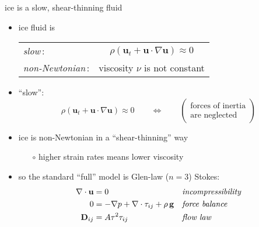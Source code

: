 \begin{frame}{ice is a slow, shear-thinning fluid}

\begin{itemize}
\item ice fluid is

\smallskip
  \begin{tabular}{lc}
  \emph{slow}\,: & $\rho \left(\mathbf{u}_t + \mathbf{u}\cdot\nabla \mathbf{u}\right) \approx 0$ \\
  \emph{non-Newtonian}\,: & viscosity $\nu$ is not constant
  \end{tabular}

\bigskip
\item ``slow'':
  $$\rho \left(\mathbf{u}_t + \mathbf{u}\cdot\nabla \mathbf{u}\right) \approx 0 \qquad \iff \qquad \begin{pmatrix} \text{forces of inertia} \\ \text{are neglected} \end{pmatrix}$$

\medskip
\item ice is non-Newtonian in a ``shear-thinning'' way
  \begin{itemize}
  \item[$\circ$] higher strain rates means lower viscosity
  \end{itemize}

\bigskip
\item so the standard ``full'' model is Glen-law ($n=3$) \alert{Stokes}:
\begin{align*}
\nabla \cdot \mathbf{u} &= 0 &&\text{\emph{incompressibility}} \\
0 &= - \nabla p + \nabla \cdot \tau_{ij} + \rho\, \mathbf{g} &&\text{\emph{force balance}} \\
\mathbf{D}_{ij} &= A \tau^2 \tau_{ij} &&\text{\emph{flow law}}
\end{align*}

\end{itemize}
\end{frame}


